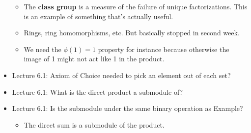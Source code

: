 \documentclass[../notes.tex]{subfiles}
\begin{document}
\begin{itemize}
\begin{itemize}
        \item The \textbf{class group} is a measure of the failure of unique factorizations. This is an example of something that's actually useful.
        \item Rings, ring homomorphisms, etc. But basically stopped in second week.
        \item We need the $\phi(1)=1$ property for instance because otherwise the image of 1 might not act like 1 in the product.
    \end{itemize}
    \item Lecture 6.1: Axiom of Choice needed to pick an element out of each set?
    \item Lecture 6.1: What is the direct product a submodule of?
    \item Lecture 6.1: Is the submodule under the same binary operation as Example?
    \begin{itemize}
        \item The direct sum is a submodule of the product.
    \end{itemize}
\end{itemize}
\end{document}
